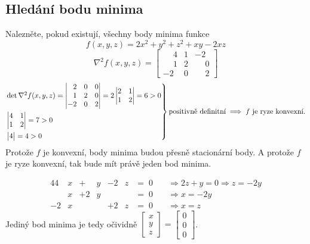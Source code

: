 \subsection{Hledání bodu minima}
Nalezněte, pokud existují, všechny body minima funkce
\[f(x, y, z) = 2x^2 + y^2 + z^2 + xy - 2xz\]
\[
    \nabla^2 f(x, y, z) = 
    \begin{bmatrix}
        \phantom{-}4 & 1 & -2 \\
        \phantom{-}1 & 2 & \phantom{-}0 \\
        -2 & 0 & \phantom{-}2
    \end{bmatrix}
\]
\[
    \begin{rcases*}
        \det \nabla^2 f(x, y, z) =
        \begin{vmatrix}
            \phantom{-}2 & 0 & 0 \\
            \phantom{-}1 & 2 & 0 \\
            -2 & 0 & 2
        \end{vmatrix} = 2 
        \begin{vmatrix}
            2 & 1 \\
            1 & 2
        \end{vmatrix} = 6 >0 \\
        \begin{vmatrix}
            4 & 1 \\
            1 & 2
        \end{vmatrix} = 7 > 0\\
        \begin{vmatrix}
            4
        \end{vmatrix} = 4 > 0
    \end{rcases*} \text{positivně definitní} \implies f \text{ je ryze konvexní.}
\]
Protože $f$ je konvexní, body minima budou přesně stacionární body. A protože $f$ je ryze konvexní, tak bude mít právě 
jeden bod minima.

\begin{alignat*}{4}
    4&x &+ \;& y &- 2&z &=\; 0 &\quad \Rightarrow 2z + y = 0 \Rightarrow z = -2y \\
    &x &+ 2& y &  &  &=\; 0 &\quad \Rightarrow x = -2y \\
   -2&x &  &  &+ 2&z &=\; 0 &\quad \Rightarrow x = z
\end{alignat*}
Jediný bod minima je tedy očividně 
$
\begin{bmatrix}
    x \\
    y \\
    z
\end{bmatrix}=
\begin{bmatrix}
    0 \\
    0 \\
    0
\end{bmatrix}
$.

